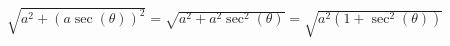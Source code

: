 \documentclass[preview]{standalone}
\begin{document}
\begin{align*}
\sqrt{a^2+(a\sec(\theta))^2} =\sqrt{a^2+a^2\sec^2(\theta)} = \sqrt{a^2(1+\sec^2(\theta))}
\end{align*}
\end{document}
